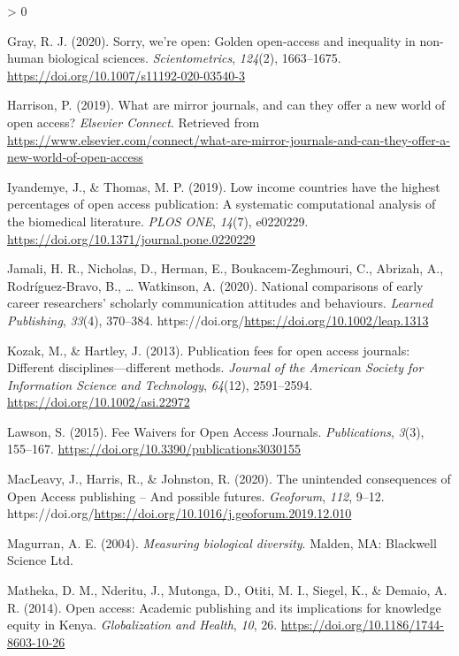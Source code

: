 \documentclass[
  english,
  man]{apa6}
\newlength{\cslhangindent}
\newenvironment{CSLReferences}[2] %
 {%
  \setlength{\parindent}{0pt}
  \ifodd #1 \everypar{\setlength{\hangindent}{\cslhangindent}}\ignorespaces\fi
  \ifnum #2 > 0
  \setlength{\parskip}{#2\baselineskip}
  \fi
 }%
 {}
\begin{document}
\begin{CSLReferences}{1}{0}
\leavevmode\hypertarget{ref-gray_sorry_2020}{}%
Gray, R. J. (2020). Sorry, we're open: {Golden} open-access and inequality in non-human biological sciences. \emph{Scientometrics}, \emph{124}(2), 1663--1675. \url{https://doi.org/10.1007/s11192-020-03540-3}

\leavevmode\hypertarget{ref-harrison_what_2019}{}%
Harrison, P. (2019). What are mirror journals, and can they offer a new world of open access? \emph{Elsevier Connect}. Retrieved from \url{https://www.elsevier.com/connect/what-are-mirror-journals-and-can-they-offer-a-new-world-of-open-access}

\leavevmode\hypertarget{ref-iyandemye_low_2019}{}%
Iyandemye, J., \& Thomas, M. P. (2019). Low income countries have the highest percentages of open access publication: {A} systematic computational analysis of the biomedical literature. \emph{PLOS ONE}, \emph{14}(7), e0220229. \url{https://doi.org/10.1371/journal.pone.0220229}

\leavevmode\hypertarget{ref-jamali_national_2020}{}%
Jamali, H. R., Nicholas, D., Herman, E., Boukacem‐Zeghmouri, C., Abrizah, A., Rodríguez‐Bravo, B., \ldots{} Watkinson, A. (2020). National comparisons of early career researchers' scholarly communication attitudes and behaviours. \emph{Learned Publishing}, \emph{33}(4), 370--384. https://doi.org/\url{https://doi.org/10.1002/leap.1313}

\leavevmode\hypertarget{ref-kozak_publication_2013}{}%
Kozak, M., \& Hartley, J. (2013). Publication fees for open access journals: {Different} disciplines---different methods. \emph{Journal of the American Society for Information Science and Technology}, \emph{64}(12), 2591--2594. \url{https://doi.org/10.1002/asi.22972}

\leavevmode\hypertarget{ref-lawson_fee_2015}{}%
Lawson, S. (2015). Fee {Waivers} for {Open} {Access} {Journals}. \emph{Publications}, \emph{3}(3), 155--167. \url{https://doi.org/10.3390/publications3030155}

\leavevmode\hypertarget{ref-macleavy_unintended_2020}{}%
MacLeavy, J., Harris, R., \& Johnston, R. (2020). The unintended consequences of {Open} {Access} publishing -- {And} possible futures. \emph{Geoforum}, \emph{112}, 9--12. https://doi.org/\url{https://doi.org/10.1016/j.geoforum.2019.12.010}

\leavevmode\hypertarget{ref-magurran_measuring_2004}{}%
Magurran, A. E. (2004). \emph{Measuring biological diversity}. Malden, MA: Blackwell Science Ltd.

\leavevmode\hypertarget{ref-matheka_open_2014}{}%
Matheka, D. M., Nderitu, J., Mutonga, D., Otiti, M. I., Siegel, K., \& Demaio, A. R. (2014). Open access: Academic publishing and its implications for knowledge equity in {Kenya}. \emph{Globalization and Health}, \emph{10}, 26. \url{https://doi.org/10.1186/1744-8603-10-26}


\end{CSLReferences}
\end{document}

